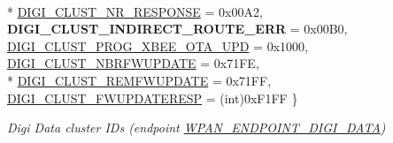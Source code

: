 \begin{DoxyCompactItemize}
\\*
\hyperlink{group__wpan__aps_gga1227ab13b41d82d9c9c9080662f74cf7a29b2b3f9713deb027140197f2ef499fa}{D\-I\-G\-I\-\_\-\-C\-L\-U\-S\-T\-\_\-\-N\-R\-\_\-\-R\-E\-S\-P\-O\-N\-S\-E} = 0x00\-A2, 
{\bfseries D\-I\-G\-I\-\_\-\-C\-L\-U\-S\-T\-\_\-\-I\-N\-D\-I\-R\-E\-C\-T\-\_\-\-R\-O\-U\-T\-E\-\_\-\-E\-R\-R} = 0x00\-B0, 
\hyperlink{group__wpan__aps_gga1227ab13b41d82d9c9c9080662f74cf7aedb825ada66b8c7bbfbeaee6d9dfba0a}{D\-I\-G\-I\-\_\-\-C\-L\-U\-S\-T\-\_\-\-P\-R\-O\-G\-\_\-\-X\-B\-E\-E\-\_\-\-O\-T\-A\-\_\-\-U\-P\-D} = 0x1000, 
\hyperlink{group__wpan__aps_gga1227ab13b41d82d9c9c9080662f74cf7a95c58dbf91ce9b915abdc1fdbc236ebe}{D\-I\-G\-I\-\_\-\-C\-L\-U\-S\-T\-\_\-\-N\-B\-R\-F\-W\-U\-P\-D\-A\-T\-E} = 0x71\-F\-E, 
\\*
\hyperlink{group__wpan__aps_gga1227ab13b41d82d9c9c9080662f74cf7a378e1e715bf4f25284c4739dccdc8c79}{D\-I\-G\-I\-\_\-\-C\-L\-U\-S\-T\-\_\-\-R\-E\-M\-F\-W\-U\-P\-D\-A\-T\-E} = 0x71\-F\-F, 
\hyperlink{group__wpan__aps_gga1227ab13b41d82d9c9c9080662f74cf7abc3b7a2d5a20c8f541dce60eb523694f}{D\-I\-G\-I\-\_\-\-C\-L\-U\-S\-T\-\_\-\-F\-W\-U\-P\-D\-A\-T\-E\-R\-E\-S\-P} = (int)0x\-F1\-F\-F
 \}
\begin{DoxyCompactList}\small\item\em Digi Data cluster I\-Ds (endpoint \hyperlink{group__wpan__aps_ga83cb85a2a1e374554f9ad735c9c06e7b}{W\-P\-A\-N\-\_\-\-E\-N\-D\-P\-O\-I\-N\-T\-\_\-\-D\-I\-G\-I\-\_\-\-D\-A\-T\-A}) \end{DoxyCompactList}\end{DoxyCompactItemize}
